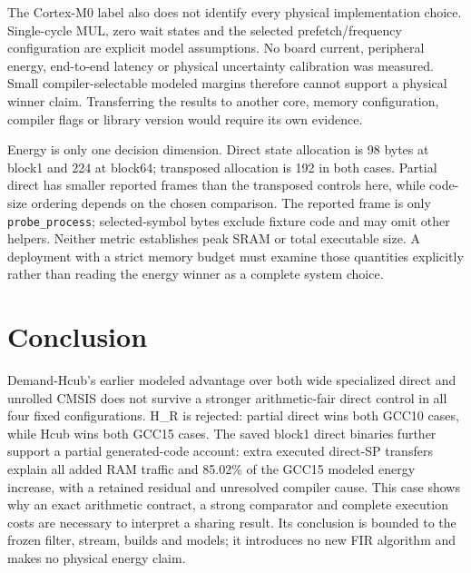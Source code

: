 \documentclass[conference]{IEEEtran}
\begin{document}
The Cortex-M0 label also does not identify every physical implementation
choice. Single-cycle MUL, zero wait states and the selected
prefetch/frequency configuration are explicit model assumptions. No
board current, peripheral energy, end-to-end latency or physical
uncertainty calibration was measured. Small compiler-selectable modeled
margins therefore cannot support a physical winner claim. Transferring
the results to another core, memory configuration, compiler flags or
library version would require its own evidence.

Energy is only one decision dimension. Direct state allocation is 98
bytes at block1 and 224 at block64; transposed allocation is 192 in both
cases. Partial direct has smaller reported frames than the transposed
controls here, while code-size ordering depends on the chosen
comparison. The reported frame is only \texttt{probe\_process};
selected-symbol bytes exclude fixture code and may omit other helpers.
Neither metric establishes peak SRAM or total executable size. A
deployment with a strict memory budget must examine those quantities
explicitly rather than reading the energy winner as a complete system
choice.

\section{Conclusion}\label{conclusion}

Demand-Hcub's earlier modeled advantage over both wide specialized
direct and unrolled CMSIS does not survive a stronger arithmetic-fair
direct control in all four fixed configurations. H\_R is rejected:
partial direct wins both GCC10 cases, while Hcub wins both GCC15 cases.
The saved block1 direct binaries further support a partial
generated-code account: extra executed direct-SP transfers explain all
added RAM traffic and 85.02\% of the GCC15 modeled energy increase, with
a retained residual and unresolved compiler cause. This case shows why
an exact arithmetic contract, a strong comparator and complete execution
costs are necessary to interpret a sharing result. Its conclusion is
bounded to the frozen filter, stream, builds and models; it introduces
no new FIR algorithm and makes no physical energy claim.
\end{document}
